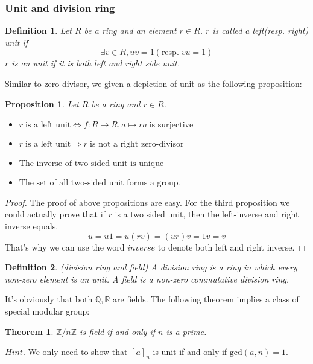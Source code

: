 \documentclass[a4paper, pdf, 11.5pt]{article}
\newtheorem{definition}{Definition}
\newtheorem{prop}{Proposition}
\newtheorem{theorem}{Theorem}
\begin{document}
\subsubsection{Unit and division ring}

\begin{definition}
Let $R$ be a ring and an element $r\in R$. $r$ is called a left(resp. right) unit if 
$$\exists v\in R, uv=1(\mbox{resp.}\;vu=1)$$ $r$ is an unit if it is both left and right side unit.
\end{definition}
\vspace{0.5cm}

Similar to zero divisor, we given a depiction of unit as the following proposition:

\begin{prop}
Let $R$ be a ring and $r\in R$. 
\begin{itemize}
  \item  $r\;\mbox{is a left unit}\Longleftrightarrow f:R\longrightarrow R,a\mapsto ra\;\mbox{is surjective}$
  \item  $r\;\mbox{is a left unit}\Longrightarrow r\;\mbox{is not a right zero-divisor}$
  \item $\mbox{The inverse of two-sided unit is unique}$
  \item  $\mbox{The set of all two-sided unit forms a group}$.
\end{itemize}
\end{prop}
\vspace{0.5cm}
\begin{proof}
The proof of above propositions are easy. For the third proposition we could actually prove that if $r$ is a two sided unit, then the left-inverse and right inverse equals. 
$$
u = u1 = u(rv) = (ur)v = 1v = v
$$
That's why we can use the word $\textit{inverse}$ to denote both left and right inverse.
\end{proof}
\vspace{0.3cm}

\begin{definition}(division ring and field)
A division ring is a ring in which every non-zero element is an unit. A field is a non-zero commutative division ring.
\end{definition}
\vspace{0.5cm}
\noindent
It's obviously that both $\mathbb{Q}, \mathbb{R}$ are fields. The following theorem implies a class of special modular group:
\begin{theorem}
$\mathbb{Z}/n\mathbb{Z}$ is field if and only  if $n$ is a prime.
\end{theorem}
\noindent
$\textit{Hint}.$ We only need to show that $[a]_{n}$ is unit if and only if $\mbox{gcd}(a, n) = 1$. 
\vspace{0.5cm}
\end{document}
